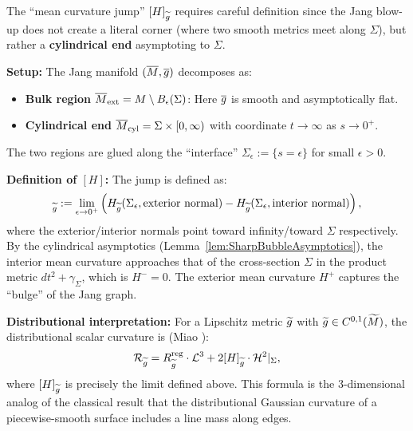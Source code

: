 \begin{remark}\label{rem:CornerGeometry}
The ``mean curvature jump'' $[H]_{\widetilde{g}}$ requires careful definition since the Jang blow-up does not create a literal corner (where two smooth metrics meet along $\Sigma$), but rather a \textbf{cylindrical end} asymptoting to $\Sigma$.

\textbf{Setup:} The Jang manifold $(\overline{M}, \overline{g})$ decomposes as:
\begin{itemize}
    \item \textbf{Bulk region} $\overline{M}_{\mathrm{ext}} = M \setminus B_\epsilon(\Sigma)$: Here $\overline{g}$ is smooth and asymptotically flat.
    \item \textbf{Cylindrical end} $\overline{M}_{\mathrm{cyl}} = \Sigma \times [0, \infty)$ with coordinate $t \to \infty$ as $s \to 0^+$.
\end{itemize}
The two regions are glued along the ``interface'' $\Sigma_\epsilon := \{s = \epsilon\}$ for small $\epsilon > 0$.

\textbf{Definition of $[H]$:} The jump is defined as:
\begin{equation}
    [H]_{\tg} := \lim_{\epsilon \to 0^+} \left( H_{\tg}(\Sigma_\epsilon, \text{exterior normal}) - H_{\tg}(\Sigma_\epsilon, \text{interior normal}) \right),
\end{equation}
where the exterior/interior normals point toward infinity/toward $\Sigma$ respectively. By the cylindrical asymptotics (Lemma~\ref{lem:SharpBubbleAsymptotics}), the interior mean curvature approaches that of the cross-section $\Sigma$ in the product metric $dt^2 + \gamma_\Sigma$, which is $H^- = 0$. The exterior mean curvature $H^+$ captures the ``bulge'' of the Jang graph.

\textbf{Distributional interpretation:} For a Lipschitz metric $\widetilde{g}$ with $\widetilde{g} \in C^{0,1}(\widetilde{M})$, the distributional scalar curvature is (Miao \cite{miao2002}):
\begin{equation}
    \mathcal{R}_{\widetilde{g}} = R_{\widetilde{g}}^{\mathrm{reg}} \cdot \mathcal{L}^3 + 2[H]_{\widetilde{g}} \cdot \mathcal{H}^2|_\Sigma,
\end{equation}
where $[H]_{\widetilde{g}}$ is precisely the limit defined above. This formula is the 3-dimensional analog of the classical result that the distributional Gaussian curvature of a piecewise-smooth surface includes a line mass along edges.
\end{remark}

